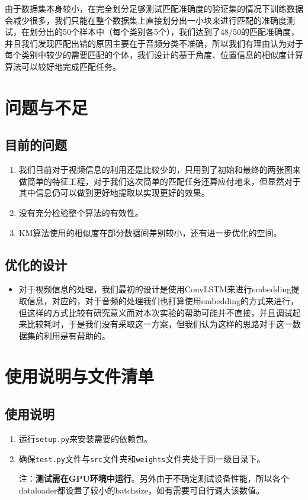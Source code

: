 \documentclass[a4paper]{ctexart}
\begin{document}
由于数据集本身较小，在完全划分足够测试匹配准确度的验证集的情况下训练数据会减少很多，我们只能在整个数据集上直接划分出一小块来进行匹配的准确度测试，在划分出的50个样本中（每个类别各5个），我们达到了48/50的匹配准确度，并且我们发现匹配出错的原因主要在于音频分类不准确，所以我们有理由认为对于每个类别中较少的需要匹配的个体，我们设计的基于角度、位置信息的相似度计算算法可以较好地完成匹配任务。

\section{问题与不足}
\subsection{目前的问题}
\begin{enumerate}
    \item 我们目前对于视频信息的利用还是比较少的，只用到了初始和最终的两张图来做简单的特征工程，对于我们这次简单的匹配任务还算应付地来，但显然对于其中信息仍可以做到更好地提取以实现更好的效果。
    \item 没有充分检验整个算法的有效性。
    \item KM算法使用的相似度在部分数据间差别较小，还有进一步优化的空间。
\end{enumerate}
\subsection{优化的设计}
\begin{itemize}
    \item 对于视频信息的处理，我们最初的设计是使用ConvLSTM来进行embedding提取信息，对应的，对于音频的处理我们也打算使用embedding的方式来进行，但这样的方式比较有研究意义而对本次实验的帮助可能并不直接，并且调试起来比较耗时，于是我们没有采取这一方案，但我们认为这样的思路对于这一数据集的利用是有帮助的。
\end{itemize}
\section{使用说明与文件清单}

\subsection{使用说明}
\begin{enumerate}

    \item 运行\texttt{setup.py}来安装需要的依赖包。

    \item 确保\texttt{test.py}文件与\texttt{src}文件夹和\texttt{weights}文件夹处于同一级目录下。
    
    注：\textbf{测试需在GPU环境中运行}。另外由于不确定测试设备性能，所以各个dataloader都设置了较小的batchsize，如有需要可自行调大该数值。

\end{enumerate}
\end{document}
